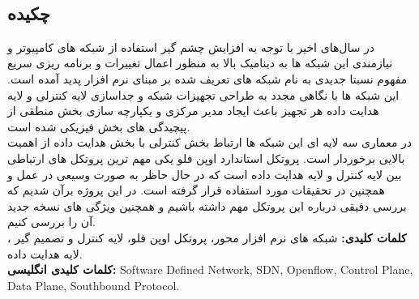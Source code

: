 
\setcounter{page}{1}
\thispagestyle{empty}

~\vfill

\subsection*{چکیده}
\begin{small}
\baselineskip=0.7cm

در سال‌های اخیر با توجه به افزایش چشم گیر استفاده از شبکه های کامپیوتر و نیازمندی این شبکه ها به دینامیک بالا به منظور اعمال تغییرات و برنامه ریزی سریع مفهوم نسبتا جدیدی به نام شبکه های تعریف شده بر مبنای نرم افزار  پدید آمده است. این شبکه ها با نگاهی مجدد به طراحی تجهیزات شبکه و جداسازی لایه کنترلی  و لایه هدایت داده  هر تجهیز باعث ایجاد مدیر مرکزی و یکپارچه سازی بخش منطقی از پیچیدگی های بخش فیزیکی شده است.\\
در معماری سه لایه ای این شبکه ها ارتباط بخش کنترلی با بخش هدایت داده از اهمیت بالایی برخوردار است. پروتکل استاندارد اوپن فلو  یکی مهم ترین پروتکل های ارتباطی بین لایه کنترل و لایه هدایت داده است که در حال حاظر به صورت وسیعی در عمل و همچنین در تحقیقات مورد استفاده قرار گرفته است. در این پروژه برآن شدیم که بررسی دقیقی درباره این پروتکل مهم داشته باشیم و همچنین ویژگی های نسخه جدید آن را بررسی کنیم.\\

\noindent\textbf{کلمات کلیدی:} شبکه های نرم افزار محور، پروتکل اوپن فلو، لایه کنترل و تصمیم گیر ، لایه هدایت داده. \\
\noindent\textbf{کلمات کلیدی انگلیسی:} Software Defined Network, SDN, Openflow, Control Plane, Data Plane, Southbound Protocol.\\

\end{small}